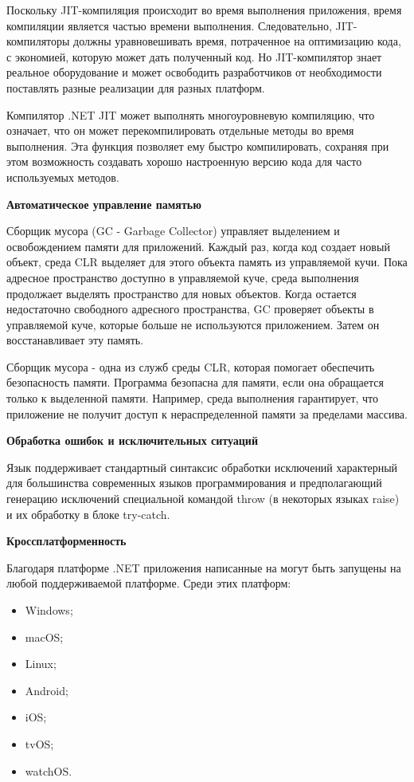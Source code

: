 Поскольку JIT-компиляция происходит во время выполнения приложения, время компиляции является частью времени выполнения. Следовательно, JIT-компиляторы должны уравновешивать время, потраченное на оптимизацию кода, с экономией, которую может дать полученный код. Но JIT-компилятор знает реальное оборудование и может освободить разработчиков от необходимости поставлять разные реализации для разных платформ.

Компилятор .NET JIT может выполнять многоуровневую компиляцию, что означает, что он может перекомпилировать отдельные методы во время выполнения. Эта функция позволяет ему быстро компилировать, сохраняя при этом возможность создавать хорошо настроенную версию кода для часто используемых методов.

\bigskip
\textbf{Автоматическое управление памятью}

Сборщик мусора (GC - Garbage Collector) управляет выделением и освобождением памяти для приложений. Каждый раз, когда код создает новый объект, среда CLR выделяет для этого объекта память из управляемой кучи. Пока адресное пространство доступно в управляемой куче, среда выполнения продолжает выделять пространство для новых объектов. Когда остается недостаточно свободного адресного пространства, GC проверяет объекты в управляемой куче, которые больше не используются приложением. Затем он восстанавливает эту память.

Сборщик мусора - одна из служб среды CLR, которая помогает обеспечить безопасность памяти. Программа безопасна для памяти, если она обращается только к выделенной памяти. Например, среда выполнения гарантирует, что приложение не получит доступ к нераспределенной памяти за пределами массива.

\bigskip
\textbf{Обработка ошибок и исключительных ситуаций}

Язык \csharp поддерживает стандартный синтаксис обработки исключений характерный для большинства современных языков программирования и предполагающий генерацию исключений специальной командой throw (в некоторых языках raise) и их обработку в блоке try-catch.

\bigskip
\textbf{Кроссплатформенность}

Благодаря платформе .NET приложения написанные на \csharp могут быть запущены на любой поддерживаемой платформе. Среди этих платформ:
\begin{itemize}
    \item Windows;
    \item macOS;
    \item Linux;
    \item Android;
    \item iOS;
    \item tvOS;
    \item watchOS.
\end{itemize}

